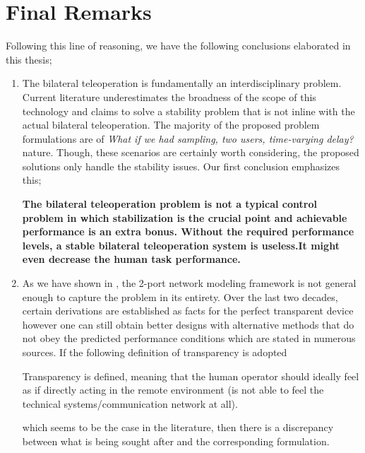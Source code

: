 \section{Final Remarks}
Following this line of reasoning, we have the following conclusions elaborated in this thesis;
\begin{enumerate}
	\item The bilateral teleoperation is fundamentally an interdisciplinary problem. Current literature underestimates the broadness of the 
    scope of this technology and claims to solve a stability problem that is not inline with the actual bilateral teleoperation. The majority
    of the proposed problem formulations are of \emph{What if we had sampling, two users, time-varying delay?} nature. Though, these scenarios 
    are certainly worth considering, the proposed solutions only handle the stability issues. Our first conclusion emphasizes this;
    
    {\bfseries The bilateral teleoperation problem is not a typical control problem in which stabilization is the crucial point and 
    achievable performance is an extra bonus. Without the required performance levels, a stable bilateral teleoperation system is useless.It 
    might even decrease the human task performance.}
    
    \item As we have shown in , the 2-port network modeling framework is not general enough to capture the problem in
    its entirety. Over the last two decades, certain derivations are established as facts for the perfect transparent device however one 
    can still obtain better designs with alternative methods that do not obey the predicted performance conditions which are stated in 
    numerous sources. If the following definition of transparency is adopted
    \begin{displayquote}
    Transparency is defined, meaning that the human operator should ideally feel as if directly acting in the remote environment
    (is not able to feel the technical systems/communication network at all).
    \end{displayquote}
    which seems to be the case in the literature, then there is a discrepancy between what is being sought after and the corresponding 
    formulation. 
    

\end{enumerate}
